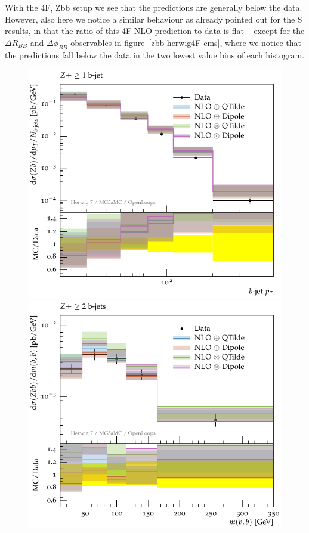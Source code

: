 \documentclass[11pt]{cernrep}
\newcommand{\Sherpa}{S\protect\scalebox{0.8}{HERPA}\xspace}
\begin{document}
With the 4F, Zbb setup we see that the predictions are generally below the
data. However, also here we notice a similar behaviour as already pointed out
for the \Sherpa results, in that the ratio of this 4F NLO prediction to data is
flat -- except for the $\Delta R_{BB}$ and $\Delta \phi_{BB}$ observables in
figure~\ref{zbb-herwig4F-cms}, where we notice that the predictions fall below
the data in the two lowest value bins of each histogram.

\begin{figure}[htbp]
\begin{center}
   \includegraphics[scale=0.65]{figs/zbb/herwigzbb/atlas-d03-x01-y01.pdf}
   \includegraphics[scale=0.65]{figs/zbb/herwigzbb/atlas-d23-x01-y01.pdf} \\

\end{center}
\end{figure}
\end{document}
